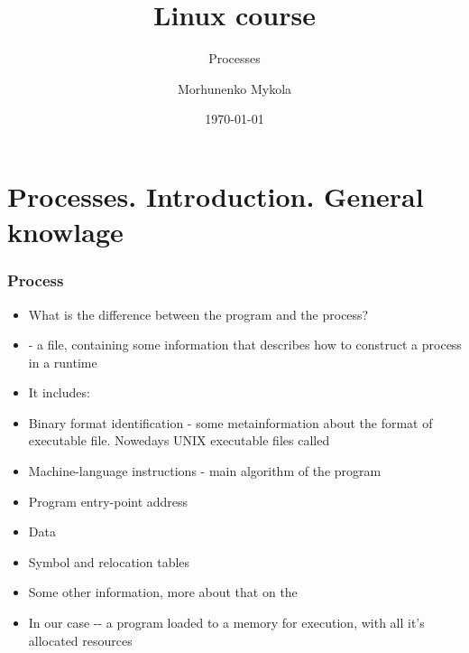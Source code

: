 \documentclass[usenames,dvipsnames,10pt,aspectratio=169]{beamer}
\title{Linux course}
\subtitle{Processes}
\date[\today]{\small\today}
\author[Morhunenko Mykola]{Morhunenko Mykola}
\institute{APPS@UCU}
\begin{document}
\begin{frame}[noframenumbering]
\titlepage
\end{frame}

\begin{frame}{\contentsname}
    \tableofcontents
\end{frame}

\section{Processes. Introduction. General knowlage}
\begin{frame}
    \frametitle{Process}
    \begin{itemize}
        \item What is the difference between the program and the process?
        \item {}- a file, containing some information that describes how to construct a process in a runtime
        \item It includes:
        \item Binary format identification - some metainformation about the format of executable file. Nowedays UNIX executable files called
        \item Machine-language instructions - main algorithm of the program
        \item Program entry-point address
        \item Data
        \item Symbol and relocation tables
        \item Some other information, more about that on the
        \item In our case -- a program loaded to a memory for execution, with all it's allocated resources
    \end{itemize}
\end{frame}
\end{document}
